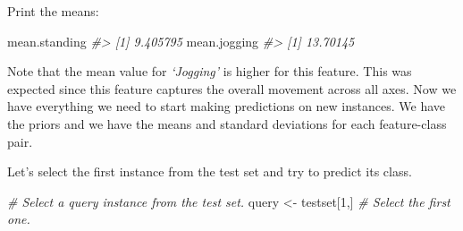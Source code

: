 \documentclass[
  11pt,
]{krantz}
\newenvironment{Shaded}{\begin{snugshade}}{\end{snugshade}}
\newcommand{\CommentTok}[1]{\textcolor[rgb]{0.37,0.37,0.37}{\textit{#1}}}
\newcommand{\DecValTok}[1]{\textcolor[rgb]{0.06,0.06,0.06}{#1}}
\newcommand{\FunctionTok}[1]{\textcolor[rgb]{0,0,0}{#1}}
\newcommand{\NormalTok}[1]{#1}
\newcommand{\OtherTok}[1]{\textcolor[rgb]{0.37,0.37,0.37}{#1}}
\newcommand{\SpecialCharTok}[1]{\textcolor[rgb]{0,0,0}{#1}}
\newcommand{\StringTok}[1]{\textcolor[rgb]{0.5,0.5,0.5}{#1}}
\begin{document}
\begin{Shaded}
\end{Shaded}

Print the means:

\begin{Shaded}
\begin{Highlighting}[]
\NormalTok{mean.standing}
\CommentTok{\#\textgreater{} [1] 9.405795}
\NormalTok{mean.jogging}
\CommentTok{\#\textgreater{} [1] 13.70145}
\end{Highlighting}
\end{Shaded}

Note that the mean value for \emph{`Jogging'} is higher for this feature. This was expected since this feature captures the overall movement across all axes. Now we have everything we need to start making predictions on new instances. We have the priors and we have the means and standard deviations for each feature-class pair.

Let's select the first instance from the test set and try to predict its class.

\begin{Shaded}
\begin{Highlighting}[]
\CommentTok{\# Select a query instance from the test set.}
\NormalTok{query }\OtherTok{\textless{}{-}}\NormalTok{ testset[}\DecValTok{1}\NormalTok{,] }\CommentTok{\# Select the first one.}
\end{Highlighting}
\end{Shaded}
\end{document}

